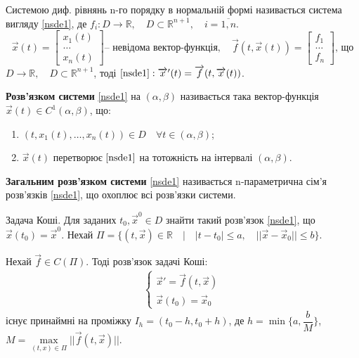 \documentclass[14pt,a4paper]{scrartcl}
\theoremstyle{definition}
\theoremstyle{definition}
\theoremstyle{definition}
\begin{document}
 Системою диф. рівнянь n-го порядку в нормальній формі називається система вигляду \eqref{nsde1}, де $ f_i : D \to \mathbb{R}, \quad D \subset \mathbb{R}^{n+1 }, \quad i = \overline{1, n}$.
\look
\[
      \overrightarrow{x}(t) = \left[\begin{array}{l}
      x_1(t)    \\
      \dots     \\
      x_n(t)
      \end{array}\right] \text{-- невідома вектор-функція}, \quad
      \overrightarrow{f}(t, \overrightarrow{x}(t)) = \left[\begin{array}{l}
      f_1     \\
      \dots  \\
      f_n
      \end{array}\right] \text{, що}
\]
$D \rightarrow \mathbb{R}, \quad D \subset \mathbb{R}^{n+1}$, тоді $\eqref{nsde1}: \overrightarrow{x}'(t) = \overrightarrow{f}(t, \overrightarrow{x}(t))$.


\def\rect{\textbf{П}}
\bd
\textbf{Розв'язком системи} \eqref{nsde1} на $(\alpha , \beta)$ називається така вектор-функція $\overrightarrow{x} (t) \in C^1(\alpha , \beta)$, що:
\begin{enumerate}
  \item $(t, x_1(t), \dots, x_n(t)) \in D \quad \forall t \in (\alpha, \beta)$;
  \item $\overrightarrow{x}(t)$  перетворює $\eqref{nsde1}$ на тотожність на інтервалі $(\alpha, \beta)$.
\end{enumerate}

\textbf{Загальним розв'язком системи}  \eqref{nsde1} називається n-параметрична сім'я розв'язків \eqref{nsde1}, що охоплює всі розв'язки системи.
\ed

Задача Коші. Для заданих $t_0, \overrightarrow{x}^{0} \in D$ знайти такий розв'язок \eqref{nsde1}, що $\overrightarrow{x} (t_0) = \overrightarrow{x}^{0}$.
Нехай $\Pi = \{(t, \overrightarrow{x}) \in \mathbb{R} \quad \big| \quad |t-t_0| \leq a, \quad ||\overrightarrow{x} - \overrightarrow{x}_0|| \leq b \}$.

\begin{boxteo}
Нехай $\overrightarrow{f} \in C(\Pi)$. Тоді розв'язок задачі Коші:
\begin{gather*}
  \begin{cases}
    \overrightarrow{x}' = \overrightarrow{f}(t, \overrightarrow{x}) \\
    \overrightarrow{x}(t_0) = \overrightarrow{x}_0
  \end{cases}
\end{gather*}
існує принаймні на проміжку $I_h = (t_0 - h, t_0 + h)$, де $h = \min\{{a, \dfrac{b}{M}}\}$, \\ $M = \max\limits_{(t, x) \in \Pi} {||\overrightarrow{f}(t, \overrightarrow{x})||}$.
\end{boxteo}
\end{document}
